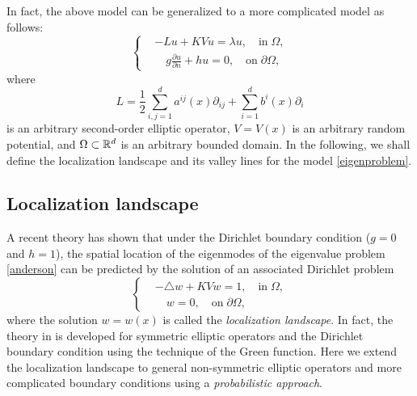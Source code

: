 \documentclass[a4paper,11pt]{article}
\begin{document}
In fact, the above model can be generalized to a more complicated model as follows:
\begin{equation}\label{eigenproblem}
\left\{
\begin{split}
& - L u + K V u = \lambda u, \quad\textrm{in}\;\Omega, \\
& \quad g \frac{\partial u}{\partial n} + h u = 0, \quad \textrm{on} \; \partial \Omega,
\end{split}
\right.
\end{equation}
where
\begin{equation}\label{operator}
L = \frac{1}{2} \sum_{i,j=1}^{d} a^{ij}(x) \partial_{ij} + \sum_{i=1}^{d} b^i(x) \partial_i
\end{equation}
is an arbitrary second-order elliptic operator, $V = V(x)$ is an arbitrary random potential, and $\Omega \subset \mathbb{R}^d$ is an arbitrary bounded domain. In the following, we shall define the localization landscape and its valley lines for the model \eqref{eigenproblem}.

\subsection{Localization landscape}
A recent theory \cite{filoche2012universal} has shown that under the Dirichlet boundary condition ($g = 0$ and $h = 1$), the spatial location of the eigenmodes of the eigenvalue problem \eqref{anderson} can be predicted by the solution of an associated Dirichlet problem
\begin{equation}\label{landDirichlet}
\left\{
\begin{split}
& -\triangle w + K V w = 1, \quad \textrm{in} \; \Omega, \\
& \quad w = 0, \quad \textrm{on} \; \partial \Omega,
\end{split}
\right.
\end{equation}
where the solution $w = w(x)$ is called the \emph{localization landscape}. In fact, the theory in \cite{filoche2012universal} is developed for symmetric elliptic operators and the Dirichlet boundary condition using the technique of the Green function. Here we extend the localization landscape to general non-symmetric elliptic operators and more complicated boundary conditions using a \emph{probabilistic approach}.
\end{document}
